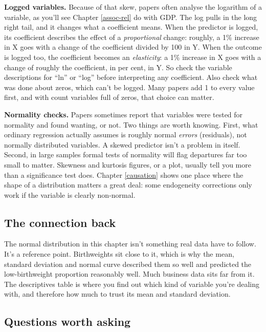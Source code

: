 \documentclass[
]{book}
\begin{document}
\textbf{Logged variables.} Because of that skew, papers often analyse the logarithm of a variable, as you'll see Chapter \ref{assoc-rel} do with GDP. The log pulls in the long right tail, and it changes what a coefficient means. When the predictor is logged, its coefficient describes the effect of a \emph{proportional} change: roughly, a 1\% increase in X goes with a change of the coefficient divided by 100 in Y. When the outcome is logged too, the coefficient becomes an \emph{elasticity}: a 1\% increase in X goes with a change of roughly the coefficient, in per cent, in Y. So check the variable descriptions for ``ln'' or ``log'' before interpreting any coefficient. Also check what was done about zeros, which can't be logged. Many papers add 1 to every value first, and with count variables full of zeros, that choice can matter.

\textbf{Normality checks.} Papers sometimes report that variables were tested for normality and found wanting, or not. Two things are worth knowing. First, what ordinary regression actually assumes is roughly normal \emph{errors} (residuals), not normally distributed variables. A skewed predictor isn't a problem in itself. Second, in large samples formal tests of normality will flag departures far too small to matter. Skewness and kurtosis figures, or a plot, usually tell you more than a significance test does. Chapter \ref{causation} shows one place where the shape of a distribution matters a great deal: some endogeneity corrections only work if the variable is clearly non-normal.

\subsection{The connection back}\label{the-connection-back-1}

The normal distribution in this chapter isn't something real data have to follow. It's a reference point. Birthweights sit close to it, which is why the mean, standard deviation and normal curve described them so well and predicted the low-birthweight proportion reasonably well. Much business data sits far from it. The descriptives table is where you find out which kind of variable you're dealing with, and therefore how much to trust its mean and standard deviation.

\subsection{Questions worth asking}\label{questions-worth-asking-1}
\end{document}
